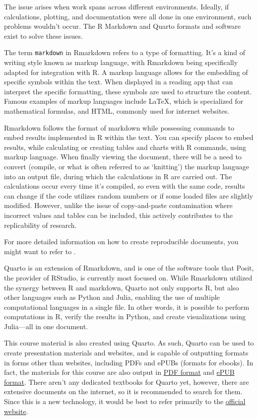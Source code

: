 \documentclass[
  a4paper,
]{book}
\begin{document}
The issue arises when work spans across different environments. Ideally,
if calculations, plotting, and documentation were all done in one
environment, such problems wouldn't occur. The R Markdown and Quarto
formats and software exist to solve these issues.

The term \texttt{markdown} in Rmarkdown refers to a type of formatting.
It's a kind of writing style known as markup language, with Rmarkdown
being specifically adapted for integration with R. A markup language
allows for the embedding of specific symbols within the text. When
displayed in a reading app that can interpret the specific formatting,
these symbols are used to structure the content. Famous examples of
markup languages include LaTeX, which is specialized for mathematical
formulas, and HTML, commonly used for internet websites.

Rmarkdown follows the format of markdown while possessing commands to
embed results implemented in R within the text. You can specify places
to embed results, while calculating or creating tables and charts with R
commands, using markup language. When finally viewing the document,
there will be a need to convert (compile, or what is often referred to
as `knitting') the markup language into an output file, during which the
calculations in R are carried out. The calculations occur every time
it's compiled, so even with the same code, results can change if the
code utilizes random numbers or if some loaded files are slightly
modified. However, unlike the issue of copy-and-paste contamination
where incorrect values and tables can be included, this actively
contributes to the replicability of research.

For more detailed information on how to create reproducible documents,
you might want to refer to \textcite{Takahashi201805}.

Quarto is an extension of Rmarkdown, and is one of the software tools
that Posit, the provider of RStudio, is currently most focused on. While
Rmarkdown utilized the synergy between R and markdown, Quarto not only
supports R, but also other languages such as Python and Julia, enabling
the use of multiple computational languages in a single file. In other
words, it is possible to perform computations in R, verify the results
in Python, and create visualizations using Julia---all in one document.

This course material is also created using Quarto. As such, Quarto can
be used to create presentation materials and websites, and is capable of
outputting formats in forms other than websites, including PDFs and
ePUBs (formats for ebooks). In fact, the materials for this course are
also output in \href{psychologystatistics_PDF}{PDF format} and
\href{psychologystatistics_epub}{ePUB format}. There aren't any
dedicated textbooks for Quarto yet, however, there are extensive
documents on the internet, so it is recommended to search for them.
Since this is a new technology, it would be best to refer primarily to
the \href{https://quarto.org/}{official website}.
\end{document}
